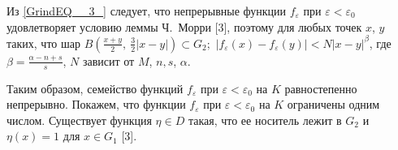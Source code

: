 Из \ref{GrindEQ__3_} следует, что непрерывные функции $f_{\varepsilon }$ при $\varepsilon <{\varepsilon }_0$ удовлетворяет условию леммы Ч.~Морри [3],
поэтому для любых точек $x$, $y$ таких, что шар $B\left(\frac{x+y}{2}, \ \frac{3}{2} \left|x-y\right|\right)\subset G_{2};$ $\left|f_{\varepsilon } \left(x\right)-f_{\varepsilon } \left(y\right)\right|<N\left|x-y\right|^{\beta } $,
где $\beta =\frac{\alpha -n+s}{s}$, $N$ зависит от $M$, $n, s$, $\alpha$.

Таким образом, семейство функций $f_{\varepsilon }$ при $\varepsilon <{\varepsilon }_0$ на $K$ равностепенно непрерывно. Покажем, что функции $f_{\varepsilon }$ при $\varepsilon <{\varepsilon }_0$ на $K$ ограничены одним числом.
Существует функция $\eta \in D$ такая, что ее носитель лежит в $G_2$ и $\eta \left(x\right)=1$ для $x\in G_1$ [3].

